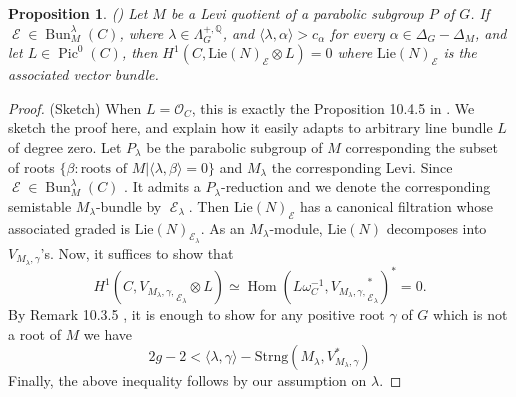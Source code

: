 \documentclass[11pt]{amsart}
\newtheorem{prop}[thm]{Proposition}
\theoremstyle{definition}
\theoremstyle{remark}
\DeclareMathOperator{\E}{\mathcal{E}}
\DeclareMathOperator{\Pic}{Pic}
\DeclareMathOperator{\Hom}{Hom}
\DeclareMathOperator{\bun}{Bun}
\newcommand{\str}{\mathrm{Strng}}
\numberwithin{equation}{section}
\begin{document}
\begin{prop}\label{vanishingH1}(\cite[Proposition 10.4.5]{DG2})
Let $M$ be a Levi quotient of a parabolic subgroup $P$ of $G$. If $\E \in \bun_M^\lambda(C)$, where $\lambda \in \Lambda_G^{+,\mathbb{Q}}$, and $ \langle \lambda,\alpha \rangle > c_\alpha$ for every $\alpha \in \Delta_G-\Delta_M$, and let $L\in \Pic^0(C)$, then $H^1(C,\text{Lie}(N)_{\E} \otimes L)=0$ where $\text{Lie}(N)_{\E}$ is the associated vector bundle.
\end{prop}
\begin{proof}(Sketch)
    When $L=\mathcal{O}_C$, this is exactly the Proposition 10.4.5 in \cite{DG2}. We sketch the proof here, and explain how it easily adapts to arbitrary line bundle $L$ of degree zero.
    Let $P_\lambda$ be the parabolic subgroup of $M$ corresponding the subset of roots $\lbrace \beta: \text{roots of $M$}| \langle \lambda, \beta \rangle=0 \rbrace$ and $M_\lambda$ the corresponding Levi. Since $\E \in  \bun_M^\lambda(C)$ . It admits a $P_\lambda$-reduction and we denote the corresponding semistable $M_\lambda$-bundle by $\E_\lambda$. Then $\text{Lie}(N)_{\E}$ has a canonical filtration whose associated graded is $\text{Lie}(N)_{\E_\lambda}$. As an $M_\lambda$-module, $\text{Lie}(N)$ decomposes into $V_{M_\lambda, \gamma}$'s.  Now, it suffices to show that
    $$H^1(C,{V_{M_\lambda, \gamma,}}_{\E_\lambda} 
    \otimes L)\simeq \Hom(L\omega_C^{-1},{V_{M_\lambda, \gamma,}}_{\E_\lambda} ^*
    )^*=0.$$
   By Remark 10.3.5 \cite{DG}, it is enough to show for any positive root $\gamma$ of $G$ which is not a root of $M$ we have
    $$ 2g-2 < \langle \lambda ,\gamma \rangle - \str(M_\lambda, V_{M_\lambda, \gamma} ^*)$$
Finally, the above inequality follows by our assumption on $\lambda$.
    
    
\end{proof}
\end{document}
